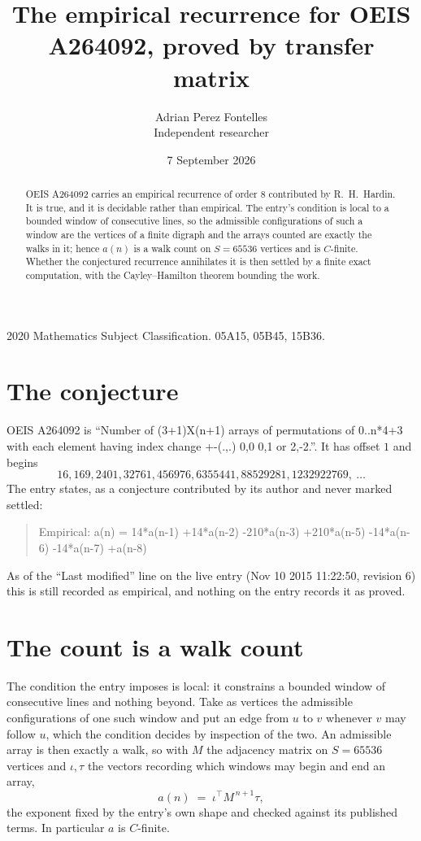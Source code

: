 \documentclass[11pt,a4paper]{article}
\title{The empirical recurrence for OEIS A264092, proved by transfer matrix}
\author{Adrian Perez Fontelles\\ \small Independent researcher}
\date{7 September 2026}
\theoremstyle{plain}
\theoremstyle{definition}
\begin{document}
\maketitle

\begin{abstract}
OEIS A264092 carries an empirical recurrence of order $8$ contributed by R.~H.~Hardin. It is
true, and it is decidable rather than empirical. The entry's condition is local to a bounded window of consecutive lines, so
the admissible configurations of such a window are the vertices of a finite digraph and the
arrays counted are exactly the walks in it; hence $a(n)$ is a walk count on $S=65536$ vertices
and is $C$-finite. Whether the conjectured recurrence annihilates it is then settled by a
finite exact computation, with the Cayley--Hamilton theorem bounding the work.
\end{abstract}

\noindent\small 2020 Mathematics Subject Classification. 05A15, 05B45, 15B36.\normalsize

\section{The conjecture}

OEIS A264092 is ``Number of (3+1)X(n+1) arrays of permutations of 0..n*4+3 with each element having index change +-(.,.) 0,0 0,1 or 2,-2.''. It has offset $1$ and begins
\[
16, 169, 2401, 32761, 456976, 6355441, 88529281, 1232922769,\ \dots
\]
The entry states, as a conjecture contributed by its author and never marked settled:
\begin{quote}
Empirical: a(n) = 14*a(n-1) +14*a(n-2) -210*a(n-3) +210*a(n-5) -14*a(n-6) -14*a(n-7) +a(n-8)
\end{quote}
As of the ``Last modified'' line on the live entry (Nov 10 2015 11:22:50, revision 6) this is still
recorded as empirical, and nothing on the entry records it as proved.

\section{The count is a walk count}

The condition the entry imposes is local: it constrains a bounded window of consecutive lines and nothing beyond. Take as
vertices the admissible configurations of one such window and put an edge from $u$ to $v$
whenever $v$ may follow $u$, which the condition decides by inspection of the two. An
admissible array is then exactly a walk, so with $M$ the adjacency matrix on $S=65536$ vertices
and $\iota,\tau$ the vectors recording which windows may begin and end an array,
\[
a(n)\;=\;\iota^{\!\top}M^{\,n+1}\tau ,
\]
the exponent fixed by the entry's own shape and checked against its published terms. In
particular $a$ is $C$-finite.
\end{document}
